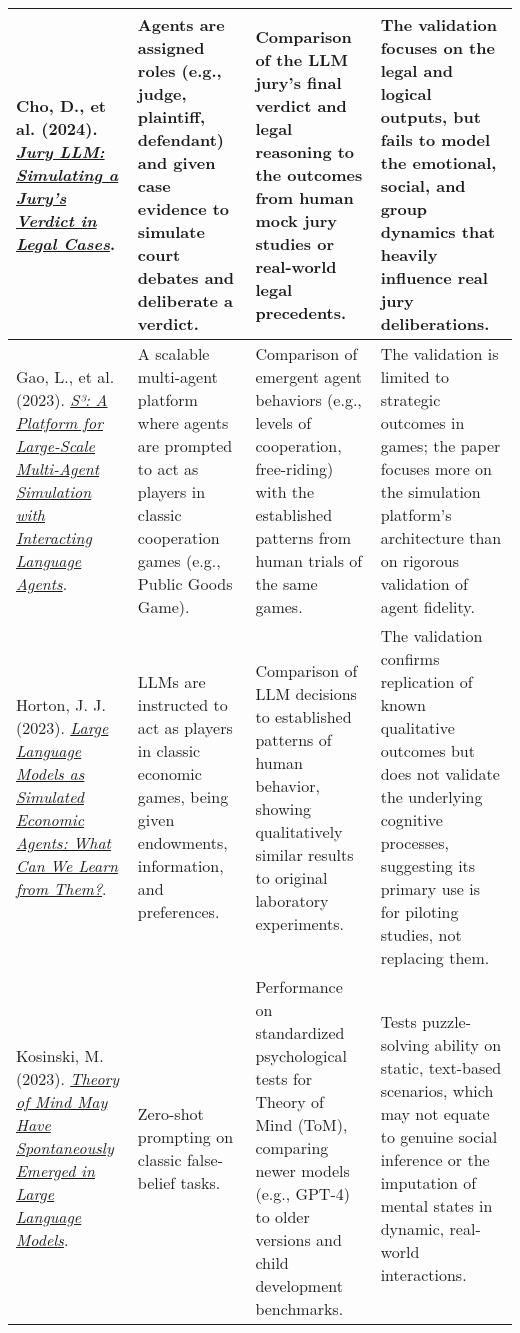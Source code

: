 {\begin{longtable}{| L{4.5cm} | L{3.5cm} | L{3.5cm} | L{3.5cm} |}
\\\hline
Cho, D., et al. (2024). \href{https://arxiv.org/abs/2403.02959}{\textit{Jury LLM: Simulating a Jury's Verdict in Legal Cases}}. & Agents are assigned roles (e.g., judge, plaintiff, defendant) and given case evidence to simulate court debates and deliberate a verdict. & Comparison of the LLM jury's final verdict and legal reasoning to the outcomes from human mock jury studies or real-world legal precedents. & The validation focuses on the legal and logical outputs, but fails to model the emotional, social, and group dynamics that heavily influence real jury deliberations.
\\\hline
Gao, L., et al. (2023). \href{https://arxiv.org/abs/2310.00322}{\textit{S³: A Platform for Large-Scale Multi-Agent Simulation with Interacting Language Agents}}. & A scalable multi-agent platform where agents are prompted to act as players in classic cooperation games (e.g., Public Goods Game). & Comparison of emergent agent behaviors (e.g., levels of cooperation, free-riding) with the established patterns from human trials of the same games. & The validation is limited to strategic outcomes in games; the paper focuses more on the simulation platform's architecture than on rigorous validation of agent fidelity.
\\\hline
Horton, J. J. (2023). \href{https://www.nber.org/papers/w31122}{\textit{Large Language Models as Simulated Economic Agents: What Can We Learn from Them?}}. & LLMs are instructed to act as players in classic economic games, being given endowments, information, and preferences. & Comparison of LLM decisions to established patterns of human behavior, showing qualitatively similar results to original laboratory experiments. & The validation confirms replication of known qualitative outcomes but does not validate the underlying cognitive processes, suggesting its primary use is for piloting studies, not replacing them.
\\\hline
Kosinski, M. (2023). \href{https://arxiv.org/abs/2302.02083}{\textit{Theory of Mind May Have Spontaneously Emerged in Large Language Models}}. & Zero-shot prompting on classic false-belief tasks. & Performance on standardized psychological tests for Theory of Mind (ToM), comparing newer models (e.g., GPT-4) to older versions and child development benchmarks. & Tests puzzle-solving ability on static, text-based scenarios, which may not equate to genuine social inference or the imputation of mental states in dynamic, real-world interactions.
\\\hline

\end{longtable}}
